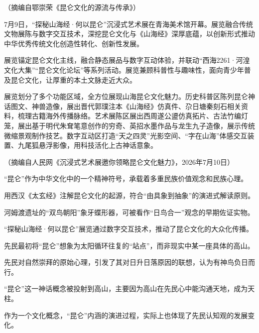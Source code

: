 \documentclass[11pt,a4paper]{ctexart}
\begin{document}
\begin{flushright}（摘编自鄂崇荣《昆仑文化的源流与传承》）\end{flushright}

\begin{materialtext}
7月9日，“探秘山海经·何以昆仑”沉浸式艺术展在青海美术馆开幕。展览融合传统文物展陈与数字交互技术，深挖昆仑文化与《山海经》深厚底蕴，以创新形式推动中华优秀传统文化创造性转化、创新性发展。

展览锚定昆仑文化主线，融合静态展品与数字互动体验，并联动“西海2261·河湟文化大集”“昆仑文化论坛”等系列活动。展览兼顾科普性与趣味性，面向青少年普及昆仑文化，让厚重的本土文脉走近大众。

展览划分了多个功能区域，全方位展现山海昆仑文化魅力。历史科普区陈列昆仑神话图文、神兽造像，展出晋代郭璞注本《山海经》仿真件、尕日塘秦刻石相关资料，梳理古籍海外传播脉络。艺术展陈区展出西周遂公盨仿真拓片、古法竹编灯笼，展出基于明代朱耷笔意创作的穷奇、英招水墨作品与龙生九子造像，展示传统微缩景观制作技艺。数字互动区打造“天之四灵”光影空间、“字在山海”体感交互装置、九尾狐悬浮影像，用科技活化上古神话意象。
\end{materialtext}
\begin{flushright}（摘编自人民网《沉浸式艺术展邀你领略昆仑文化魅力》，2026年7月10日）\end{flushright}

\begin{choices}
\item “昆仑”作为中华文化中的一个精神符号，承载着多重民族价值观念和民族心理。
\item 用西汉《太玄经》注解昆仑文化的起源，符合“由具象到抽象”的演进式解读原则。
\item 河姆渡遗址的“双鸟朝阳”象牙蝶形器，可被看作“日鸟合一”观念的早期佐证实物。
\item “探秘山海经·何以昆仑”展览通过数字交互技术，推动了昆仑文化的大众化传播。
\end{choices}

\begin{choices}
\item 先民最初将“昆仑”想象为太阳循环往复的“站点”，而非现实中某一座具体的高山。
\item 先民对自然崇拜的原始心理，引发了其对日升日落原因的联想，认为有神鸟负日而行。
\item “昆仑”这一神话概念被投射到高山，主要因为高山在先民心中能沟通天地，成为天柱。
\item 作为一个文化概念，“昆仑”内涵的演进过程，实际上也体现了先民认知观的发展变化。
\end{choices}
\end{document}
